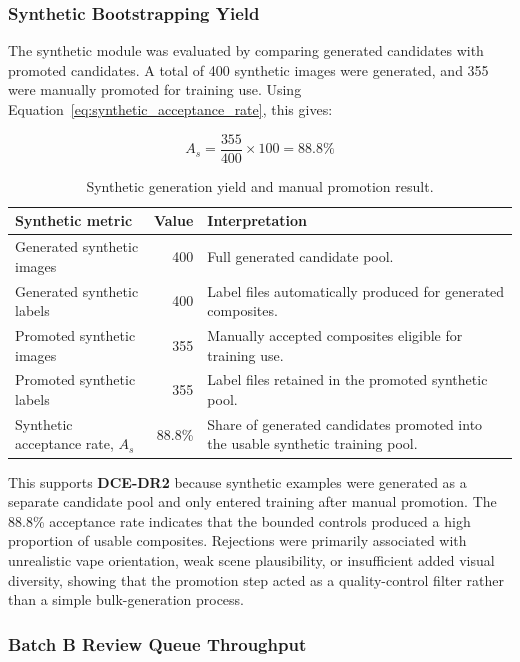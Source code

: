 \subsubsection{Synthetic Bootstrapping Yield}

The synthetic module was evaluated by comparing generated candidates with promoted candidates. A total of 400 synthetic images were generated, and 355 were manually promoted for training use. Using Equation~\ref{eq:synthetic_acceptance_rate}, this gives:

\begin{equation}
A_s = \frac{355}{400} \times 100 = 88.8\%
\end{equation}

\begin{table}[H]
\centering
\small
\renewcommand{\arraystretch}{1.2}
\begin{tabularx}{\textwidth}{p{} r X}
\toprule
\textbf{Synthetic metric} & \textbf{Value} & \textbf{Interpretation} \\
\midrule
Generated synthetic images & 400 & Full generated candidate pool. \\
Generated synthetic labels & 400 & Label files automatically produced for generated composites. \\
Promoted synthetic images & 355 & Manually accepted composites eligible for training use. \\
Promoted synthetic labels & 355 & Label files retained in the promoted synthetic pool. \\
Synthetic acceptance rate, $A_s$ & 88.8\% & Share of generated candidates promoted into the usable synthetic training pool. \\
\bottomrule
\end{tabularx}
\caption{Synthetic generation yield and manual promotion result.}
\label{tab:dce_results_synthetic}
\end{table}

This supports \textbf{DCE-DR2} because synthetic examples were generated as a separate candidate pool and only entered training after manual promotion. The 88.8\% acceptance rate indicates that the bounded controls produced a high proportion of usable composites. Rejections were primarily associated with unrealistic vape orientation, weak scene plausibility, or insufficient added visual diversity, showing that the promotion step acted as a quality-control filter rather than a simple bulk-generation process.

\subsubsection{Batch B Review Queue Throughput}

